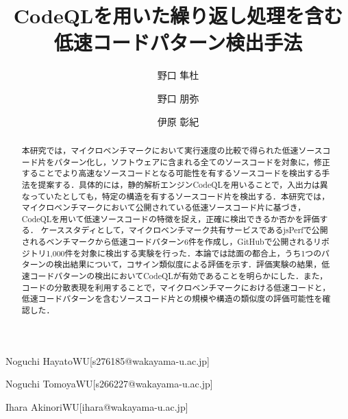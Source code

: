 \documentclass[submit,techrep,noauthor]{ipsj}
\newcommand{\todo}[1]{\colorbox{yellow}{{\bf TODO}:}{\color{red} {\textbf{[#1]}}}}
\begin{document}
\title{CodeQLを用いた繰り返し処理を含む
\\
低速コードパターン検出手法
}


\author{野口 隼杜}{Noguchi Hayato}{WU}[s276185@wakayama-u.ac.jp]
\author{野口 朋弥}{Noguchi Tomoya}{WU}[s266227@wakayama-u.ac.jp]
\author{伊原 彰紀}{Ihara Akinori}{WU}[ihara@wakayama-u.ac.jp]

\begin{abstract}
本研究では，マイクロベンチマークにおいて実行速度の比較で得られた低速ソースコード片をパターン化し，ソフトウェアに含まれる全てのソースコードを対象に，修正することでより高速なソースコードとなる可能性を有するソースコードを検出する手法を提案する．具体的には，静的解析エンジンCodeQLを用いることで，入出力は異なっていたとしても，特定の構造を有するソースコード片を検出する．本研究では，マイクロベンチマークにおいて公開されている低速ソースコード片に基づき，CodeQLを用いて低速ソースコードの特徴を捉え，正確に検出できるか否かを評価する．
ケーススタディとして，マイクロベンチマーク共有サービスであるjsPerfで公開されるベンチマークから低速コードパターン6件を作成し，GitHubで公開されるリポジトリ1,000件を対象に検出する実験を行った．本論では誌面の都合上，うち1つのパターンの検出結果について，コサイン類似度による評価を示す．評価実験の結果，低速コードパターンの検出においてCodeQLが有効であることを明らかにした．また，コードの分散表現を利用することで，マイクロベンチマークにおける低速コードと，低速コードパターンを含むソースコード片との規模や構造の類似度の評価可能性を確認した．


\end{abstract}
\end{document}
